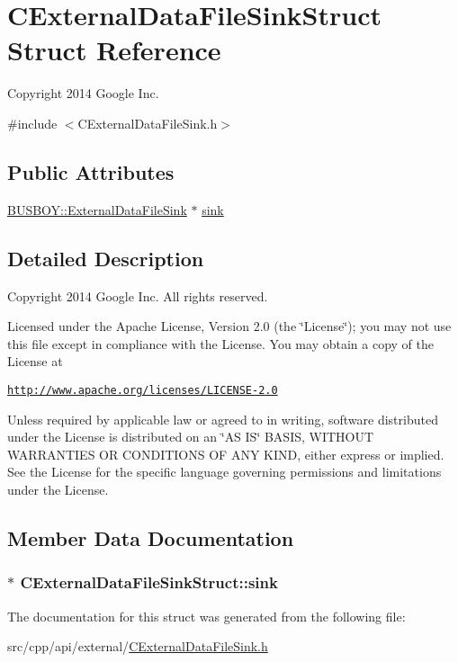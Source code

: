 \hypertarget{structCExternalDataFileSinkStruct}{
\section{CExternalDataFileSinkStruct Struct Reference}
\label{structCExternalDataFileSinkStruct}
}


Copyright 2014 Google Inc.  


{\ttfamily \#include $<$CExternalDataFileSink.h$>$}\subsection*{Public Attributes}
\begin{DoxyCompactItemize}
\item 
\hyperlink{classBUSBOY_1_1ExternalDataFileSink}{BUSBOY::ExternalDataFileSink} $\ast$ \hyperlink{structCExternalDataFileSinkStruct_a089557c34dc8718074b32ac0d7abf873}{sink}
\end{DoxyCompactItemize}


\subsection{Detailed Description}
Copyright 2014 Google Inc. All rights reserved.

Licensed under the Apache License, Version 2.0 (the \char`\"{}License\char`\"{}); you may not use this file except in compliance with the License. You may obtain a copy of the License at

\href{http://www.apache.org/licenses/LICENSE-2.0}{\tt http://www.apache.org/licenses/LICENSE-\/2.0}

Unless required by applicable law or agreed to in writing, software distributed under the License is distributed on an \char`\"{}AS IS\char`\"{} BASIS, WITHOUT WARRANTIES OR CONDITIONS OF ANY KIND, either express or implied. See the License for the specific language governing permissions and limitations under the License. 

\subsection{Member Data Documentation}
\hypertarget{structCExternalDataFileSinkStruct_a089557c34dc8718074b32ac0d7abf873}{
\subsubsection[{sink}]{$\ast$ {\bf CExternalDataFileSinkStruct::sink}}}
\label{structCExternalDataFileSinkStruct_a089557c34dc8718074b32ac0d7abf873}


The documentation for this struct was generated from the following file:\begin{DoxyCompactItemize}
\item 
src/cpp/api/external/\hyperlink{CExternalDataFileSink_8h}{CExternalDataFileSink.h}\end{DoxyCompactItemize}
